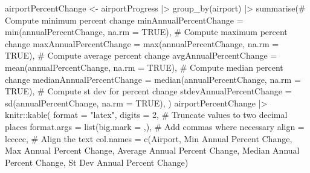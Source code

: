 \documentclass[
  letterpaper,
  DIV=11,
  numbers=noendperiod]{scrartcl}
\newenvironment{Shaded}{\begin{snugshade}}{\end{snugshade}}
\newcommand{\AttributeTok}[1]{\textcolor[rgb]{0.40,0.45,0.13}{#1}}
\newcommand{\CommentTok}[1]{\textcolor[rgb]{0.37,0.37,0.37}{#1}}
\newcommand{\ConstantTok}[1]{\textcolor[rgb]{0.56,0.35,0.01}{#1}}
\newcommand{\DecValTok}[1]{\textcolor[rgb]{0.68,0.00,0.00}{#1}}
\newcommand{\FunctionTok}[1]{\textcolor[rgb]{0.28,0.35,0.67}{#1}}
\newcommand{\NormalTok}[1]{\textcolor[rgb]{0.00,0.23,0.31}{#1}}
\newcommand{\OtherTok}[1]{\textcolor[rgb]{0.00,0.23,0.31}{#1}}
\newcommand{\SpecialCharTok}[1]{\textcolor[rgb]{0.37,0.37,0.37}{#1}}
\newcommand{\StringTok}[1]{\textcolor[rgb]{0.13,0.47,0.30}{#1}}
\begin{document}
\begin{Shaded}
\begin{Highlighting}[]
\NormalTok{airportPercentChange }\OtherTok{\textless{}{-}}\NormalTok{ airportProgress }\SpecialCharTok{|\textgreater{}}
  \FunctionTok{group\_by}\NormalTok{(airport) }\SpecialCharTok{|\textgreater{}}
  \FunctionTok{summarise}\NormalTok{(}\CommentTok{\# Compute minimum percent change}
            \AttributeTok{minAnnualPercentChange =} \FunctionTok{min}\NormalTok{(annualPercentChange, }\AttributeTok{na.rm =} \ConstantTok{TRUE}\NormalTok{), }
            \CommentTok{\# Compute maximum percent change}
            \AttributeTok{maxAnnualPercentChange =} \FunctionTok{max}\NormalTok{(annualPercentChange, }\AttributeTok{na.rm =} \ConstantTok{TRUE}\NormalTok{), }
            \CommentTok{\# Compute average percent change}
            \AttributeTok{avgAnnualPercentChange =} \FunctionTok{mean}\NormalTok{(annualPercentChange, }\AttributeTok{na.rm =} \ConstantTok{TRUE}\NormalTok{), }
            \CommentTok{\# Compute median percent change}
            \AttributeTok{medianAnnualPercentChange =} \FunctionTok{median}\NormalTok{(annualPercentChange, }\AttributeTok{na.rm =} \ConstantTok{TRUE}\NormalTok{), }
            \CommentTok{\# Compute st dev for percent change}
            \AttributeTok{stdevAnnualPercentChange =} \FunctionTok{sd}\NormalTok{(annualPercentChange, }\AttributeTok{na.rm =} \ConstantTok{TRUE}\NormalTok{), }
\NormalTok{            )}
\NormalTok{airportPercentChange }\SpecialCharTok{|\textgreater{}}
\NormalTok{  knitr}\SpecialCharTok{::}\FunctionTok{kable}\NormalTok{(}
    \AttributeTok{format =} \StringTok{"latex"}\NormalTok{,}
    \AttributeTok{digits =} \DecValTok{2}\NormalTok{, }\CommentTok{\# Truncate values to two decimal places}
    \AttributeTok{format.args =} \FunctionTok{list}\NormalTok{(}\AttributeTok{big.mark =} \StringTok{\textquotesingle{},\textquotesingle{}}\NormalTok{), }\CommentTok{\# Add commas where necessary}
    \AttributeTok{align =} \StringTok{\textquotesingle{}lccccc\textquotesingle{}}\NormalTok{, }\CommentTok{\# Align the text}
    \AttributeTok{col.names =} \FunctionTok{c}\NormalTok{(}\StringTok{\textquotesingle{}Airport\textquotesingle{}}\NormalTok{, }\StringTok{\textquotesingle{}Min Annual Percent Change\textquotesingle{}}\NormalTok{, }
                  \StringTok{\textquotesingle{}Max Annual Percent Change\textquotesingle{}}\NormalTok{, }
                  \StringTok{\textquotesingle{}Average Annual Percent Change\textquotesingle{}}\NormalTok{, }
                  \StringTok{\textquotesingle{}Median Annual Percent Change\textquotesingle{}}\NormalTok{, }
                  \StringTok{\textquotesingle{}St Dev Annual Percent Change\textquotesingle{}}\NormalTok{) }

\end{Highlighting}
\end{Shaded}
\end{document}
